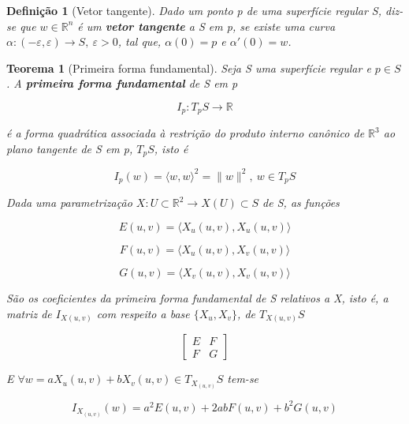 \documentclass{article}
\newtheorem{theorem}{Teorema}
\newtheorem{definition}{Definição}
\begin{document}
\begin{definition}[Vetor tangente]
Dado um ponto p de uma superfície regular S, diz-se que $w \in \mathbb{R}^n$ é um \textbf{vetor tangente} a S em p, se existe uma curva $\alpha: (- \varepsilon, \varepsilon) \rightarrow S,\ \varepsilon > 0$, tal que, $\alpha(0) = p$ e $\alpha'(0) = w$.
\end{definition}

\begin{theorem}[Primeira forma fundamental]
Seja S uma superfície regular e $p \in S$. A \textbf{primeira forma fundamental} de S em p

$$I_p : T_p S \rightarrow \mathbb{R}$$

é a forma quadrática associada à restrição do produto interno canônico de $\mathbb{R}^3$ ao plano tangente de S em p, $T_p S$, isto é

$$I_p(w) = \langle w,w \rangle^2 = \| w \|^2,\ w \in T_p S$$

Dada uma parametrização $X: U \subset \mathbb{R}^2 \rightarrow X(U) \subset S$ de S, as funções


\begin{equation*}
    E(u, v) = \langle X_u(u, v), X_u(u, v) \rangle
\end{equation*}

\begin{equation*}
    F(u, v) = \langle X_u(u, v), X_v(u, v) \rangle
\end{equation*}

\begin{equation*}
    G(u, v) = \langle X_v(u, v), X_v(u, v) \rangle
\end{equation*}

São os coeficientes da primeira forma fundamental de S relativos a X, isto é, a matriz de $I_{X(u, v)}$ com respeito a base $\{X_u, X_v\}$, de $T_{X(u, v)} S$

$$
\begin{bmatrix}
E & F\\
F & G
\end{bmatrix}
$$

E $\forall w = a X_u(u, v) + b X_v(u, v) \in T_{X_(u, v)} S$ tem-se

$$I_{X_(u, v)}(w) = a^2 E(u, v) + 2 a b F(u, v) + b^2 G(u, v)$$
\end{theorem}
\end{document}

